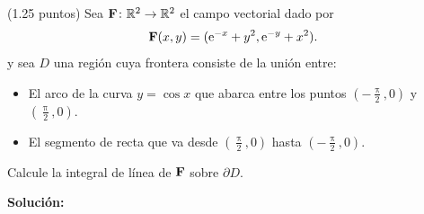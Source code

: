 \documentclass{fmbvecto}
\begin{document}
\begin{problema}
    
    (1.25 puntos) Sea \(\boldsymbol{{\mathbf{F}}}\colon \mathbb{R}^2 \to \mathbb{R}^2\) el campo vectorial dado por
    \[
    \boldsymbol{{\mathbf{F}}}(x, y) = (\mathrm{e}^{-x} + y^2, \mathrm{e}^{-y} + x^2).
    \]
    y sea \(D\) una región cuya frontera consiste de la unión entre:
    \begin{itemize}
    \item El arco de la curva \(y = \cos x\) que abarca entre los puntos \(\left(-\frac{\uppi}{2}, 0\right)\) y \(\left(\frac{\uppi}{2}, 0\right)\).
    \item El segmento de recta que va desde \(\left(\frac{\uppi}{2}, 0\right)\) hasta \(\left(-\frac{\uppi}{2}, 0\right)\).
    \end{itemize}
    Calcule la integral de línea de \(\boldsymbol{{\mathbf{F}}}\) sobre \(\partial D\).

\tcblower
\textbf{Solución:}


\end{problema}
\end{document}
